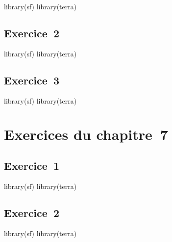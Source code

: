\documentclass[
  letterpaper,
  DIV=11,
  numbers=noendperiod]{scrreprt}
\newenvironment{Shaded}{\begin{snugshade}}{\end{snugshade}}
\newcommand{\NormalTok}[1]{\textcolor[rgb]{0.00,0.23,0.31}{#1}}
\begin{document}
\begin{Shaded}
\begin{Highlighting}[]
\NormalTok{library(sf)}
\NormalTok{library(terra)}
\end{Highlighting}
\end{Shaded}

\subsection{Exercice~2}\label{sec-08062}

\begin{Shaded}
\begin{Highlighting}[]
\NormalTok{library(sf)}
\NormalTok{library(terra)}
\end{Highlighting}
\end{Shaded}

\subsection{Exercice~3}\label{sec-08063}

\begin{Shaded}
\begin{Highlighting}[]
\NormalTok{library(sf)}
\NormalTok{library(terra)}
\end{Highlighting}
\end{Shaded}

\section{Exercices du chapitre~7}\label{sec-0807}

\subsection{Exercice~1}\label{sec-08071}

\begin{Shaded}
\begin{Highlighting}[]
\NormalTok{library(sf)}
\NormalTok{library(terra)}
\end{Highlighting}
\end{Shaded}

\subsection{Exercice~2}\label{sec-08072}

\begin{Shaded}
\begin{Highlighting}[]
\NormalTok{library(sf)}
\NormalTok{library(terra)}
\end{Highlighting}
\end{Shaded}
\end{document}
